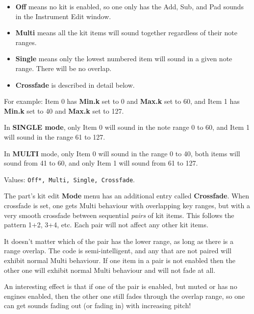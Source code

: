    \begin{itemize}
      \item \textbf{Off} means no kit is enabled, so one only has the Add,
         Sub, and Pad sounds in the Instrument Edit window.
      \item \textbf{Multi} means all the kit items will sound together
         regardless of their note ranges.
      \item \textbf{Single} means only the lowest numbered item will sound
         in a given note range. There will be no overlap.
      \item \textbf{Crossfade} is described in detail below.
   \end{itemize}

   For example:
   Item 0 has \textbf{Min.k} set to 0 and \textbf{Max.k} set to 60, and
   Item 1 has \textbf{Min.k} set to 40 and \textbf{Max.k} set to 127.

   In \textbf{SINGLE mode}, only Item 0 will sound in the note range 0 to
   60, and Item 1 will sound in the range 61 to 127.

   In \textbf{MULTI} mode, only Item 0 will sound in the range 0 to 40, both
   items will sound from 41 to 60, and only Item 1 will sound from 61 to
   127.

   Values: \texttt{Off*, Multi, Single, Crossfade}.

   The part's kit edit \textbf{Mode} menu has an additional entry
   called \textbf{Crossfade}.
   When crossfade is set, one gets Multi behaviour with overlapping key
   ranges, but with a very smooth crossfade between sequential \textsl{pairs}
   of kit items. This follows the pattern 1+2, 3+4, etc. Each pair will not
   affect any other kit items.

   It doesn't matter which of the pair has the lower range, as long as there is
   a range overlap. The code is semi-intelligent, and any that are not paired
   will exhibit normal Multi behaviour. If one item in a pair is not enabled
   then the other one will exhibit normal Multi behaviour and will not fade at
   all.

   An interesting effect is that if one of the pair is enabled, but muted or
   has no engines enabled, then the other one still fades through the overlap
   range, so one can get sounds fading out (or fading in) with increasing
   pitch!

